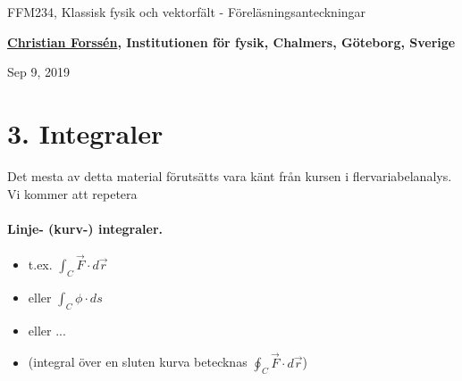 \documentclass[%
oneside,                 %
final,                   %
10pt]{article}
\begin{document}

\newcommand{\exercisesection}[1]{\subsection*{#1}}







\thispagestyle{empty}

\begin{center}
{\LARGE\bf
\begin{spacing}{1.25}
FFM234, Klassisk fysik och vektorfält - Föreläsningsanteckningar
\end{spacing}
}
\end{center}


\begin{center}
{\bf \href{{http://fy.chalmers.se/subatom/tsp/}}{Christian Forssén}, Institutionen för fysik, Chalmers, Göteborg, Sverige${}^{}$} \\ [0mm]
\end{center}

\begin{center}
\end{center}
    

\begin{center}
Sep 9, 2019
\end{center}

\vspace{1cm}


\section*{3. Integraler}
Det mesta av detta material förutsätts vara känt från kursen i flervariabelanalys. Vi kommer att repetera
\paragraph{Linje- (kurv-) integraler.}
\begin{itemize}
\item t.ex. $\int_C \vec{F} \cdot d\vec{r}$

\item eller $\int_C \phi \cdot ds$

\item eller ...

\item (integral över en sluten kurva betecknas $\oint_C \vec{F} \cdot d\vec{r}$)
\end{itemize}
\end{document}
